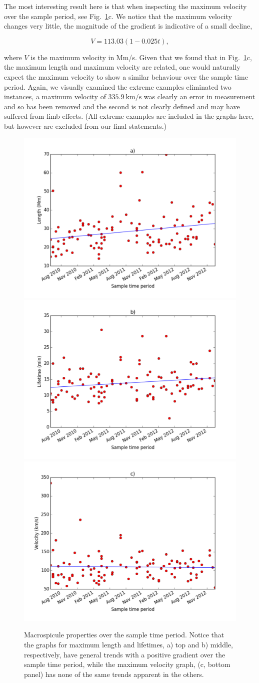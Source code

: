 The most interesting result here is that when inspecting the maximum velocity over the sample period, see Fig.~\ref{fig:sol-cyc-rels}c. We notice that the maximum velocity changes very little, the magnitude of the gradient is indicative of a small decline, 

\begin{equation}
V = 113.03(1 - 0.025t),
\end{equation}

\noindent where $V$ is the maximum velocity in Mm/s. Given that we found that in Fig.~\ref{fig:sol-cyc-rels}c, the maximum length and maximum velocity are related, one would naturally expect the maximum velocity to show a similar behaviour over the sample time period. Again, we visually examined the extreme examples eliminated two instances, a maximum velocity of $335.9\ \textrm{km/s}$ was clearly an error in measurement and so has been removed and the second is not clearly defined and may have suffered from limb effects. (All extreme examples are included in the graphs here, but however are excluded from our final statements.)

\begin{figure}[h]
	\centering
	\includegraphics[width=0.4\columnwidth]{Chapter3/Figs/length_vs_solarcycle.pdf}
	\includegraphics[width=0.4\columnwidth]{Chapter3/Figs/life_vs_solarcycle.pdf}
	\includegraphics[width=0.4\columnwidth]{Chapter3/Figs/velocity_vs_solarcycle.pdf}
	\caption{\small Macrospicule properties over the sample time period. Notice that the graphs for maximum length and lifetimes, a) top and b) middle, respectively, have general trends with a positive gradient over the sample time period, while the maximum velocity graph, (c, bottom panel) has none of the same trends apparent in the others.}
	\label{fig:sol-cyc-rels}
\end{figure}


